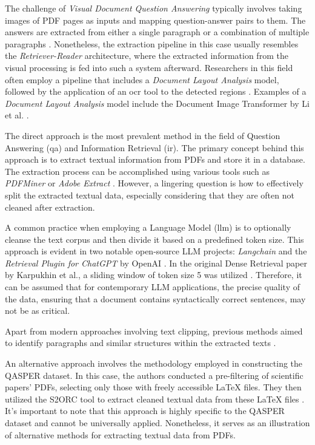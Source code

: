 The challenge of \textit{Visual Document Question Answering} typically involves taking images of PDF pages as inputs and mapping question-answer pairs to them. The answers are extracted from either a single paragraph or a combination of multiple paragraphs \cite{mathew_document_2021}. Nonetheless, the extraction pipeline in this case usually resembles the \textit{Retriever-Reader} architecture, where the extracted information from the visual processing is fed into such a system afterward. Researchers in this field often employ a pipeline that includes a \textit{Document Layout Analysis} model, followed by the application of an \gls{ocr} tool to the detected regions \cite{mcdonald_detect_2022}. Examples of a \textit{Document Layout Analysis} model include the Document Image Transformer by Li et al. \cite{li_dit_2022}.

The direct approach is the most prevalent method in the field of Question Answering (\gls{qa}) and Information Retrieval (\gls{ir}). The primary concept behind this approach is to extract textual information from PDFs and store it in a database. The extraction process can be accomplished using various tools such as \textit{PDFMiner} or \textit{Adobe Extract} \cite{meuschke_benchmark_2023}. However, a lingering question is how to effectively split the extracted textual data, especially considering that they are often not cleaned after extraction.

A common practice when employing a Language Model (\gls{llm}) is to optionally cleanse the text corpus and then divide it based on a predefined token size. This approach is evident in two notable open-source LLM projects: \textit{Langchain} and the \textit{Retrieval Plugin for ChatGPT} by OpenAI \cite{noauthor_langchain-ailangchain_nodate,noauthor_chatgpt_2023}. In the original Dense Retrieval paper by Karpukhin et al., a sliding window of token size 5 was utilized \cite{karpukhin_dense_2020}. Therefore, it can be assumed that for contemporary LLM applications, the precise quality of the data, ensuring that a document contains syntactically correct sentences, may not be as critical.

Apart from modern approaches involving text clipping, previous methods aimed to identify paragraphs and similar structures within the extracted texts \cite{zhu_retrieving_2021}.

An alternative approach involves the methodology employed in constructing the QASPER dataset. In this case, the authors conducted a pre-filtering of scientific papers' PDFs, selecting only those with freely accessible LaTeX files. They then utilized the S2ORC tool to extract cleaned textual data from these LaTeX files \cite{dasigi_dataset_2021}. It's important to note that this approach is highly specific to the QASPER dataset and cannot be universally applied. Nonetheless, it serves as an illustration of alternative methods for extracting textual data from PDFs.

